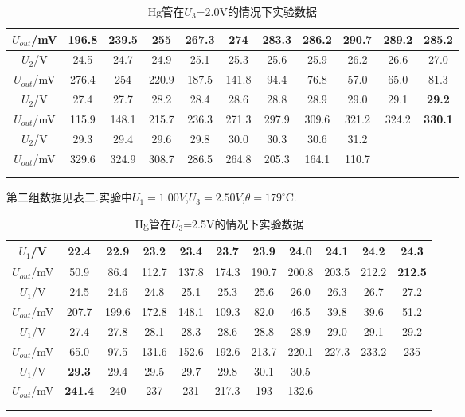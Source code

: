 \documentclass[a4paper,10pt,notitlepage]{article}
\begin{document}
\begin{center}
\begin{longtable}{|c|c|c|c|c|c|c|c|c|c|c|}
	\hline
	$U_{out}$/mV & 196.8 & 239.5 & 255 & 267.3 & 274 & 283.3 & 286.2 & \textbf{290.7} & 289.2 & 285.2 \\
	\hline
	\hline
	$U_2$/V & 24.5 & 24.7 & 24.9 & 25.1 & 25.3 & 25.6 & 25.9 & 26.2 & 26.6 & 27.0 \\
	\hline
	$U_{out}$/mV & 276.4 & 254 & 220.9 & 187.5 & 141.8 & 94.4 & 76.8 & 57.0 & 65.0 & 81.3 \\
	\hline
	\hline
	$U_2$/V & 27.4 & 27.7 & 28.2 & 28.4 & 28.6 & 28.8 & 28.9 & 29.0 & 29.1 & \textbf{29.2} \\
	\hline
	$U_{out}$/mV & 115.9 & 148.1 & 215.7 & 236.3 & 271.3 & 297.9 & 309.6 & 321.2 & 324.2 & \textbf{330.1} \\
	\hline
	\hline
	$U_2$/V & 29.3 & 29.4 & 29.6 & 29.8 & 30.0 & 30.3 & 30.6 & 31.2 &  &\\
	\hline
	$U_{out}$/mV & 329.6 & 324.9 & 308.7 & 286.5 & 264.8 & 205.3 & 164.1 & 110.7 &&  \\
	\hline
	\multicolumn{1}{c}{ } \\
	\caption{Hg管在$U_3$=2.0V的情况下实验数据}
	\end{longtable}
	
\end{center}

	第二组数据见表二.实验中$U_1 = 1.00V$,$U_3 = 2.50V$,$\theta = 179^\circ$C.
	
\begin{center}

	\begin{longtable}{|c|c|c|c|c|c|c|c|c|c|c|}
	\hline
	$U_1$/V & 22.4 & 22.9 & 23.2 & 23.4 & 23.7 & 23.9 & 24.0 & 24.1 & 24.2 & \textbf{24.3} \\
	\hline
	$U_{out}$/mV & 50.9 & 86.4 & 112.7 & 137.8 & 174.3 & 190.7 & 200.8 & 203.5 & 212.2 & \textbf{212.5} \\
	\hline
	\hline
	$U_1$/V & 24.5 & 24.6 & 24.8 & 25.1 & 25.3 & 25.6 & 26.0 & 26.3 & 26.7 & 27.2 \\
	\hline
	$U_{out}$/mV & 207.7 & 199.6 & 172.8 & 148.1 & 109.3 & 82.0 & 46.5 & 39.8 & 39.6 & 51.2 \\
	\hline
	\hline
	$U_1$/V & 27.4 & 27.8 & 28.1 & 28.3 & 28.6 & 28.8 & 28.9 & 29.0 & 29.1 & 29.2 \\
	\hline
	$U_{out}$/mV & 65.0 & 97.5 & 131.6 & 152.6 & 192.6 & 213.7 & 220.1 & 227.3 & 233.2 & 235 \\
	\hline
	\hline
	$U_1$/V & \textbf{29.3} & 29.4 & 29.5 & 29.7 & 29.8 & 30.1 & 30.5 & && \\
	\hline
	$U_{out}$/mV & \textbf{241.4} & 240 & 237 & 231 & 217.3 & 193 & 132.6 &&&  \\
	\hline
	\multicolumn{1}{c}{ } \\
	\caption{Hg管在$U_3$=2.5V的情况下实验数据}
	\end{longtable}

\end{center}
\end{document}

